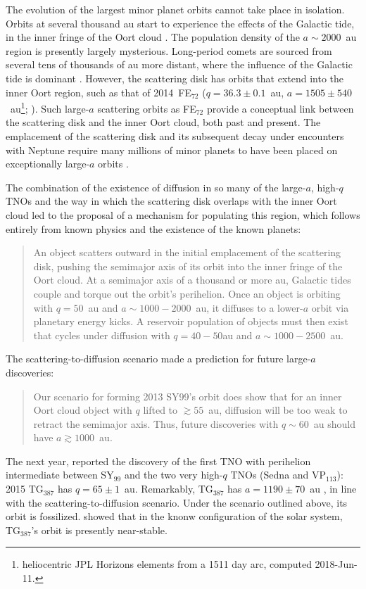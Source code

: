 \documentclass[preprint]{aastex62}
\begin{document}
The evolution of the largest minor planet orbits cannot take place in isolation. 
Orbits at several thousand au start to experience the effects of the Galactic tide, in the inner fringe of the Oort cloud \citep{dones04}.
The population density of the $a \sim 2000$~au region is presently largely mysterious. 
Long-period comets are sourced from several tens of thousands of au more distant, where the influence of the Galactic tide is dominant \cite[e.g.][]{dones04}.
However, the scattering disk has orbits that extend into the inner Oort region, such as that of 2014~FE$_{72}$ ($q = 36.3\pm 0.1$~au, $a=1505\pm 540$~au\footnote{heliocentric JPL Horizons elements from a 1511 day arc, computed 2018-Jun-11.}; \citealt{sheppardtrujillo16}).
Such large-$a$ scattering orbits as FE$_{72}$ provide a conceptual link between the scattering disk and the inner Oort cloud, both past and present.
The emplacement of the scattering disk and its subsequent decay under encounters with Neptune require many millions of minor planets to have been placed on exceptionally large-$a$ orbits \citep{gladman05, levison06}.

The combination of the existence of diffusion in so many of the large-$a$, high-$q$ TNOs and the way in which the scattering disk overlaps with the inner Oort cloud led \citet{bannister17} to the proposal of a mechanism for populating this region, which follows entirely from known physics and the existence of the known planets:
\begin{quote}
An object scatters outward in the initial emplacement of the scattering disk, pushing the semimajor axis of its orbit into the inner fringe of the Oort cloud. At a semimajor axis of a thousand or more au, Galactic tides couple and torque out the orbit's perihelion. Once an object is orbiting with $q = 50$~au and $a\sim1000-2000$~au, it diffuses to a lower-$a$ orbit via planetary energy kicks. A reservoir population of objects must then exist that cycles under diffusion with $q = 40-50$au and $a\sim1000-2500$~au.
\end{quote}
The scattering-to-diffusion scenario made a prediction for future large-$a$ discoveries: 
\begin{quote}
    Our scenario for forming 2013 SY99's orbit does show that for an inner Oort cloud object with $q$ lifted to $\gtrsim 55$~au, diffusion will be too weak to retract the semimajor axis. Thus, future discoveries with $q\sim60$~au should have $a \gtrsim 1000$~au.
\end{quote}
The next year, \citet{sheppard18} reported the discovery of the first TNO with perihelion intermediate between SY$_{99}$ and the two very high-$q$ TNOs (Sedna and VP$_{113}$): 2015 TG$_{387}$ has $q=65 \pm 1$~au. 
Remarkably, TG$_{387}$ has $a = 1190 \pm 70$~au \citep{sheppard18}, in line with the scattering-to-diffusion scenario.
Under the scenario outlined above, its orbit is fossilized. \citet{sheppard18} showed that in the knonw configuration of the solar system, TG$_{387}$'s orbit is presently near-stable. 
\end{document}
